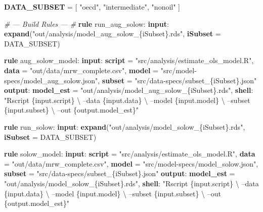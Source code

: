 \documentclass[]{book}
\newenvironment{Shaded}{\begin{snugshade}}{\end{snugshade}}
\newcommand{\KeywordTok}[1]{\textcolor[rgb]{0.13,0.29,0.53}{\textbf{{#1}}}}
\newcommand{\StringTok}[1]{\textcolor[rgb]{0.31,0.60,0.02}{{#1}}}
\newcommand{\CommentTok}[1]{\textcolor[rgb]{0.56,0.35,0.01}{\textit{{#1}}}}
\newcommand{\NormalTok}[1]{{#1}}
\theoremstyle{definition}
\theoremstyle{definition}
\theoremstyle{definition}
\theoremstyle{remark}
\begin{document}
\begin{Shaded}
\begin{Highlighting}[]
\KeywordTok{DATA_SUBSET} \NormalTok{= [}
                \StringTok{"oecd"}\NormalTok{,}
                \StringTok{"intermediate"}\NormalTok{,}
                \StringTok{"nonoil"}
                \NormalTok{]}

\CommentTok{# --- Build Rules --- #}
\KeywordTok{rule} \NormalTok{run_aug_solow:}
    \KeywordTok{input}\NormalTok{:}
        \KeywordTok{expand}\NormalTok{(}\StringTok{"out/analysis/model_aug_solow_\{iSubset\}.rds"}\NormalTok{,}
                    \KeywordTok{iSubset} \NormalTok{= DATA_SUBSET)}

\KeywordTok{rule} \NormalTok{aug_solow_model:}
    \KeywordTok{input}\NormalTok{:}
        \KeywordTok{script} \NormalTok{= }\StringTok{"src/analysis/estimate_ols_model.R"}\NormalTok{,}
        \KeywordTok{data}   \NormalTok{= }\StringTok{"out/data/mrw_complete.csv"}\NormalTok{,}
        \KeywordTok{model}  \NormalTok{= }\StringTok{"src/model-specs/model_aug_solow.json"}\NormalTok{,}
        \KeywordTok{subset} \NormalTok{= }\StringTok{"src/data-specs/subset_\{iSubset\}.json"}
    \KeywordTok{output}\NormalTok{:}
        \KeywordTok{model_est} \NormalTok{= }\StringTok{"out/analysis/model_aug_solow_\{iSubset\}.rds"}\NormalTok{,}
    \KeywordTok{shell}\NormalTok{:}
        \StringTok{"Rscript \{input.script\} \textbackslash{}}
\StringTok{            --data \{input.data\} \textbackslash{}}
\StringTok{            --model \{input.model\} \textbackslash{}}
\StringTok{            --subset \{input.subset\} \textbackslash{}}
\StringTok{            --out \{output.model_est\}"}

\KeywordTok{rule} \NormalTok{run_solow:}
    \KeywordTok{input}\NormalTok{:}
        \KeywordTok{expand}\NormalTok{(}\StringTok{"out/analysis/model_solow_\{iSubset\}.rds"}\NormalTok{,}
                    \KeywordTok{iSubset} \NormalTok{= DATA_SUBSET)}

\KeywordTok{rule} \NormalTok{solow_model:}
    \KeywordTok{input}\NormalTok{:}
        \KeywordTok{script} \NormalTok{= }\StringTok{"src/analysis/estimate_ols_model.R"}\NormalTok{,}
        \KeywordTok{data}   \NormalTok{= }\StringTok{"out/data/mrw_complete.csv"}\NormalTok{,}
        \KeywordTok{model}  \NormalTok{= }\StringTok{"src/model-specs/model_solow.json"}\NormalTok{,}
        \KeywordTok{subset} \NormalTok{= }\StringTok{"src/data-specs/subset_\{iSubset\}.json"}
    \KeywordTok{output}\NormalTok{:}
        \KeywordTok{model_est} \NormalTok{= }\StringTok{"out/analysis/model_solow_\{iSubset\}.rds"}\NormalTok{,}
    \KeywordTok{shell}\NormalTok{:}
        \StringTok{"Rscript \{input.script\} \textbackslash{}}
\StringTok{            --data \{input.data\} \textbackslash{}}
\StringTok{            --model \{input.model\} \textbackslash{}}
\StringTok{            --subset \{input.subset\} \textbackslash{}}
\StringTok{            --out \{output.model_est\}"}
\end{Highlighting}
\end{Shaded}
\end{document}
